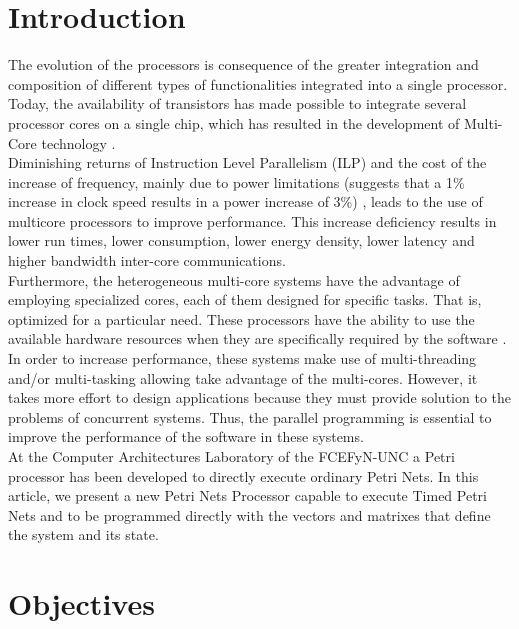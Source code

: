\section{Introduction}
	
	The evolution of the processors is consequence of the greater integration and composition of different 
	types of functionalities integrated into a single processor. Today, the availability of transistors 
	has made possible to integrate several processor cores on a single chip, which has resulted in 
	the development of Multi-Core technology \cite{hennessypatterson}.
	\\
	
	Diminishing returns of Instruction Level Parallelism (ILP) and the cost of the increase of frequency, 
	mainly due to power limitations (suggests that a 1\% increase in clock speed results in a power 
	increase of 3\%) \cite{gspn}, leads to the use of multicore processors to improve performance. 
	This increase deficiency results in lower run times, lower consumption, lower energy density, 
	lower latency and higher bandwidth inter-core communications.
	\\
	
	Furthermore, the heterogeneous multi-core systems have the advantage of employing specialized cores, 
	each of them designed for specific tasks. That is, optimized for a particular need. These processors 
	have the ability to use the available hardware resources when they are specifically required by 
	the software  \cite{SriramBhattacharyya}.
	\\
	
	In order to increase performance, these systems make use of multi-threading and/or multi-tasking 
	allowing take advantage of the multi-cores. However, it takes more effort to design applications 
	because they must provide solution to the problems of concurrent systems. Thus, the parallel 
	programming is essential to improve the performance of the software in these systems.
    \\
	
	At the Computer Architectures Laboratory of the FCEFyN-UNC a Petri processor has been developed 
	to directly execute ordinary Petri Nets. In this article, we present a new Petri Nets Processor 
	capable to execute Timed Petri Nets and to be programmed directly with the vectors and matrixes 
	that define the system and its state.
	
\section{Objectives}

